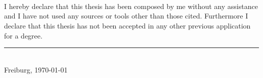 \\\\\\
I hereby declare that this thesis has been composed by me without any assistance and I have not used any sources or tools other than those cited. 
Furthermore I declare that this thesis has not been accepted in any other previous application for a degree.
\vfill
\rule{5cm}{.5pt}\\
\phantom{ab}Freiburg, \today